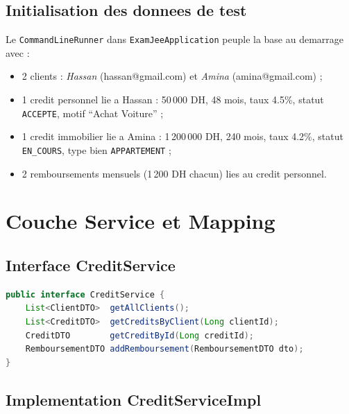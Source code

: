\documentclass[12pt,a4paper]{report}
\begin{document}
\section{Initialisation des donnees de test}

Le \texttt{CommandLineRunner} dans \texttt{ExamJeeApplication} peuple la base
au demarrage avec :

\begin{itemize}
    \item 2 clients : \textit{Hassan} (hassan@gmail.com) et
          \textit{Amina} (amina@gmail.com) ;
    \item 1 credit personnel lie a Hassan :
          50\,000 DH, 48 mois, taux 4.5\%, statut \texttt{ACCEPTE},
          motif ``Achat Voiture'' ;
    \item 1 credit immobilier lie a Amina :
          1\,200\,000 DH, 240 mois, taux 4.2\%, statut \texttt{EN\_COURS},
          type bien \texttt{APPARTEMENT} ;
    \item 2 remboursements mensuels (1\,200 DH chacun) lies au credit personnel.
\end{itemize}

\chapter{Couche Service et Mapping}

\section{Interface CreditService}

\begin{lstlisting}[language=Java, caption={Interface CreditService}]
public interface CreditService {
    List<ClientDTO>  getAllClients();
    List<CreditDTO>  getCreditsByClient(Long clientId);
    CreditDTO        getCreditById(Long creditId);
    RemboursementDTO addRemboursement(RemboursementDTO dto);
}
\end{lstlisting}

\section{Implementation CreditServiceImpl}
\end{document}
